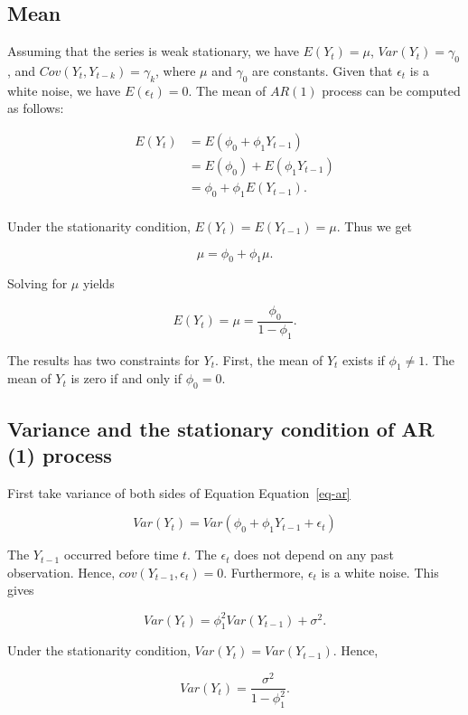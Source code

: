\documentclass[
  11pt,
  a4paper,
]{report}
\begin{document}
\subsection{Mean}\label{mean}

Assuming that the series is weak stationary, we have \(E(Y_t)=\mu\),
\(Var(Y_t)=\gamma_0\), and \(Cov(Y_t, Y_{t-k})=\gamma_k\), where \(\mu\)
and \(\gamma_0\) are constants. Given that \({\epsilon_t}\) is a white
noise, we have \(E(\epsilon_t)=0\). The mean of \(AR(1)\) process can be
computed as follows:

\[
\begin{aligned}
  E(Y_t) &= E(\phi_0+\phi_1 Y_{t-1}) \\
         &= E(\phi_0) +E(\phi_1 Y_{t-1}) \\
         &= \phi_0 +\phi_1 E(Y_{t-1}). \\
\end{aligned}
\]

Under the stationarity condition, \(E(Y_t)=E(Y_{t-1})=\mu\). Thus we get

\[\mu = \phi_0+\phi_1\mu.\]

Solving for \(\mu\) yields

\begin{equation}
E(Y_t)=\mu=\frac{\phi_0}{1-\phi_1}.
\end{equation}

The results has two constraints for \(Y_t\). First, the mean of \(Y_t\)
exists if \(\phi_1 \neq 1 .\) The mean of \(Y_t\) is zero if and only if
\(\phi_0=0\).

\subsection{Variance and the stationary condition of AR (1)
process}\label{variance-and-the-stationary-condition-of-ar-1-process}

First take variance of both sides of Equation Equation~\ref{eq-ar}

\[Var(Y_t)=Var(\phi_0+\phi_1 Y_{t-1}+\epsilon_t)\]

The \(Y_{t-1}\) occurred before time \(t\). The \(\epsilon_t\) does not
depend on any past observation. Hence, \(cov(Y_{t-1}, \epsilon_t)= 0\).
Furthermore, \({\epsilon_t}\) is a white noise. This gives

\[Var(Y_t)=\phi_1^2 Var(Y_{t-1})+\sigma^2.\]

Under the stationarity condition, \(Var(Y_t)=Var(Y_{t-1})\). Hence,

\[Var(Y_t)=\frac{\sigma^2}{1-\phi_1^2}.\]
\end{document}
